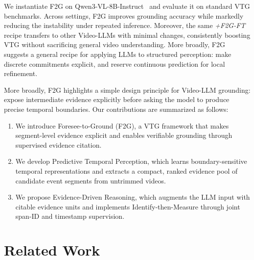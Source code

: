 \documentclass{article}
\theoremstyle{plain}
\theoremstyle{definition}
\theoremstyle{remark}
\begin{document}
We instantiate F2G on Qwen3-VL-8B-Instruct~\cite{Qwen3-VL} and evaluate it on standard VTG benchmarks.
Across settings, F2G improves grounding accuracy while markedly reducing the instability under repeated inference.
Moreover, the same \textit{+F2G-FT} recipe transfers to other Video-LLMs with minimal changes, consistently boosting VTG without sacrificing general video understanding.
More broadly, F2G suggests a general recipe for applying LLMs to structured perception:
make discrete commitments explicit, and reserve continuous prediction for local refinement. 

More broadly, F2G highlights a simple design principle for Video-LLM grounding: expose intermediate evidence explicitly before asking the model to produce precise temporal boundaries. Our contributions are summarized as follows:

\par\vspace{-0.8em}
\begin{enumerate}
    \setlength{\itemsep}{0pt}
    \setlength{\topsep}{0pt}
    \setlength{\parsep}{0pt}
    \setlength{\partopsep}{0pt}
    \setlength{\parskip}{0pt}
    \item We introduce Foresee-to-Ground (F2G), a VTG framework that makes segment-level evidence explicit and enables verifiable grounding through supervised evidence citation.
    \item We develop Predictive Temporal Perception, which learns boundary-sensitive temporal representations and extracts a compact, ranked evidence pool of candidate event segments from untrimmed videos.
    \item We propose Evidence-Driven Reasoning, which augments the LLM input with citable evidence units and implements Identify-then-Measure through joint span-ID and timestamp supervision.
\end{enumerate}
\vspace{-0.4em}


\section{Related Work}
\end{document}
